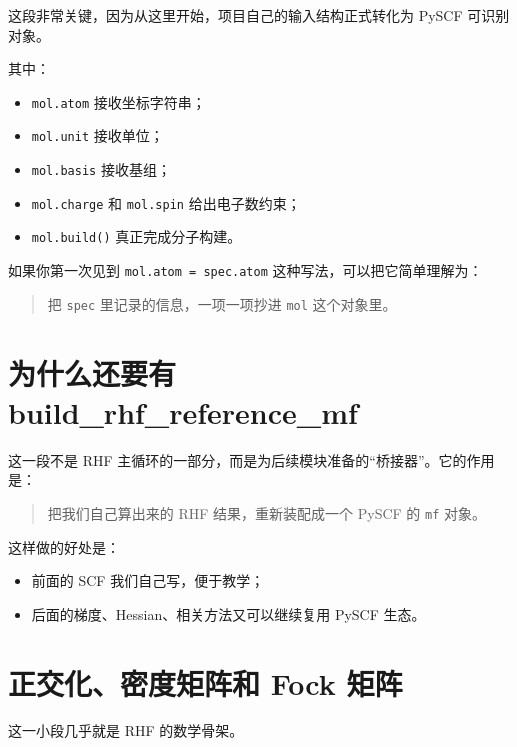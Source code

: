 \documentclass[UTF8,11pt,fontset=fandol]{ctexbook}
\begin{document}


这段非常关键，因为从这里开始，项目自己的输入结构正式转化为 PySCF 可识别对象。

其中：
\begin{itemize}
  \item \texttt{mol.atom} 接收坐标字符串；
  \item \texttt{mol.unit} 接收单位；
  \item \texttt{mol.basis} 接收基组；
  \item \texttt{mol.charge} 和 \texttt{mol.spin} 给出电子数约束；
  \item \texttt{mol.build()} 真正完成分子构建。
\end{itemize}

如果你第一次见到 \texttt{mol.atom = spec.atom} 这种写法，可以把它简单理解为：

\begin{quote}
把 \texttt{spec} 里记录的信息，一项一项抄进 \texttt{mol} 这个对象里。
\end{quote}

\section{为什么还要有 build\_rhf\_reference\_mf}



这一段不是 RHF 主循环的一部分，而是为后续模块准备的“桥接器”。它的作用是：

\begin{quote}
把我们自己算出来的 RHF 结果，重新装配成一个 PySCF 的 \texttt{mf} 对象。
\end{quote}

这样做的好处是：
\begin{itemize}
  \item 前面的 SCF 我们自己写，便于教学；
  \item 后面的梯度、Hessian、相关方法又可以继续复用 PySCF 生态。
\end{itemize}

\section{正交化、密度矩阵和 Fock 矩阵}



这一小段几乎就是 RHF 的数学骨架。
\end{document}
